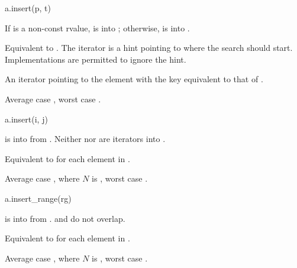 %
\begin{itemdecl}
a.insert(p, t)
\end{itemdecl}

\begin{itemdescr}
\pnum
\result
{}

\pnum
\expects
If  is a non-const rvalue,
 is  into ;
otherwise,  is  into .

\pnum
\effects
Equivalent to .
The iterator  is a hint pointing to where the search should start.
Implementations are permitted to ignore the hint.

\pnum
\returns
An iterator pointing to
the element with the key equivalent to that of .

\pnum
\complexity
Average case , worst case .
\end{itemdescr}

%
\begin{itemdecl}
a.insert(i, j)
\end{itemdecl}

\begin{itemdescr}
\pnum
\result
{}

\pnum
\expects
{} is
 into  from .
Neither  nor  are iterators into .

\pnum
\effects
Equivalent to  for each element in .

\pnum
\complexity
Average case , where $N$ is ,
worst case .
\end{itemdescr}

%
\begin{itemdecl}
a.insert_range(rg)
\end{itemdecl}

\begin{itemdescr}
\pnum
\result
{}

\pnum
\expects
{} is
 into 
from .
 and  do not overlap.

\pnum
\effects
Equivalent to  for each element  in .

\pnum
\complexity
Average case , where $N$ is ,
worst case .
\end{itemdescr}

